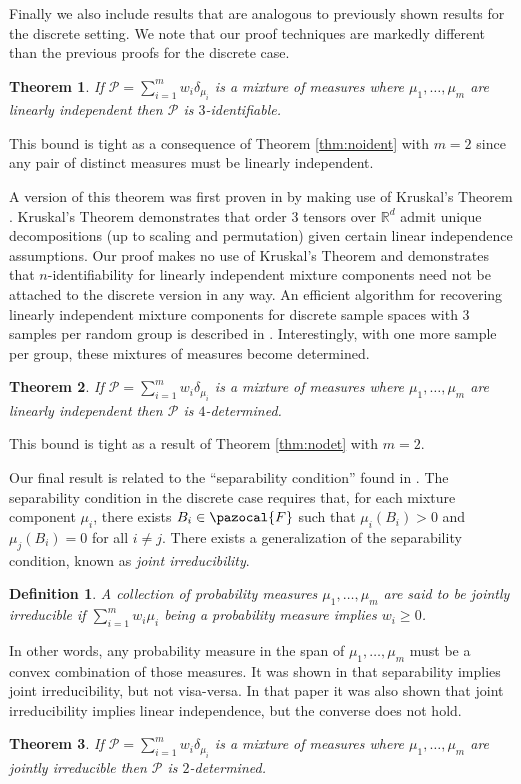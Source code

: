 \documentclass[aos,preprint]{imsart}
\def\rn{\mathbb{R}}
\def\sF{\pazocal{F}}
\def\sP{\mathscr{P}}
\theoremstyle{plain}
\newtheorem{thm}{Theorem}[section]
\theoremstyle{defintion}
\newtheorem{defin}{Definition}[section]
\begin{document}
	Finally we also include results that are analogous to previously shown results for the discrete setting. We note that our proof techniques are markedly different than the previous proofs for the discrete case.
	\begin{thm} \label{thm:liident}
		If $\sP = \sum_{i=1}^m  w_i\delta_{\mu_i}$ is a mixture of measures where $\mu_1,\ldots,\mu_m$ are linearly independent then $\sP$ is $3$-identifiable.
	\end{thm}
	This bound is tight as a consequence of Theorem \ref{thm:noident} with $m=2$ since any pair of distinct measures must be linearly independent.

	A version of this theorem was first proven in \cite{allman09} by making use of Kruskal's Theorem \cite{kruskal77}. Kruskal's Theorem demonstrates that order 3 tensors over $\rn^d$ admit unique decompositions (up to scaling and permutation) given certain linear independence assumptions. Our proof makes no use of Kruskal's Theorem and demonstrates that $n$-identifiability for linearly independent mixture components need not be attached to the discrete version in any way. An efficient algorithm for recovering linearly independent mixture components for discrete sample spaces with 3 samples per random group is described in \cite{anandkumar14}. Interestingly, with one more sample per group, these mixtures of measures become determined.
	\begin{thm} \label{thm:lidet}
		\sloppy If $\sP = \sum_{i=1}^m  w_i\delta_{\mu_i}$ is a mixture of measures where $\mu_1,\ldots,\mu_m$ are linearly independent then $\sP$ is $4$-determined.
	\end{thm}
	This bound is tight as a result of Theorem \ref{thm:nodet} with $m=2$.

	Our final result is related to the ``separability condition'' found in \cite{donoho03}. The separability condition in the discrete case requires that, for each mixture component $\mu_i$, there exists $B_i\in \sF$ such that $\mu_i\left( B_i \right)>0$ and $\mu_j\left( B_i \right) = 0$ for all $i\neq j$. There exists a generalization of the separability condition, known as {\em joint irreducibility}.
	\begin{defin}
		A collection of probability measures $\mu_1,\ldots,\mu_m$ are said to be {\em jointly irreducible} if $\sum_{i=1}^{m} w_i \mu_i$ being a probability measure implies $w_i\ge0$. 
	\end{defin}
	In other words, any probability measure in the span of $\mu_1,\ldots,\mu_m$ must be a convex combination of those measures. It was shown in \cite{blanchard14} that separability implies joint irreducibility, but not visa-versa. In that paper it was also shown that joint irreducibility implies linear independence, but the converse does not hold. 
	\begin{thm} \label{thm:ji}
		\sloppy If $\sP= \sum_{i=1}^m w_i \delta_{\mu_i} $ is a mixture of measures where $\mu_1,\ldots, \mu_m$ are jointly irreducible then $\sP$ is $2$-determined.
	\end{thm}
\end{document}
